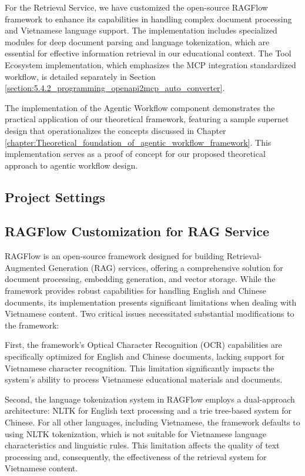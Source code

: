 \documentclass[../Main.tex]{subfiles}
\begin{document}
For the Retrieval Service, we have customized the open-source RAGFlow framework to enhance its capabilities in handling complex document processing and Vietnamese language support. The implementation includes specialized modules for deep document parsing and language tokenization, which are essential for effective information retrieval in our educational context. The Tool Ecosystem implementation, which emphasizes the MCP integration standardized workflow, is detailed separately in Section \ref{section:5.4.2_programming_openapi2mcp_auto_converter}.

The implementation of the Agentic Workflow component demonstrates the practical application of our theoretical framework, featuring a sample supernet design that operationalizes the concepts discussed in Chapter \ref{chapter:Theoretical_foundation_of_agentic_workflow_framework}. This implementation serves as a proof of concept for our proposed theoretical approach to agentic workflow design.

\subsection{Project Settings}
\label{section:5.1.1_project_settings}

\subsection{RAGFlow Customization for RAG Service}
\label{section:5.1.2_ragflow_customization}

RAGFlow is an open-source framework designed for building Retrieval-Augmented Generation (RAG) services, offering a comprehensive solution for document processing, embedding generation, and vector storage. While the framework provides robust capabilities for handling English and Chinese documents, its implementation presents significant limitations when dealing with Vietnamese content. Two critical issues necessitated substantial modifications to the framework:

First, the framework's Optical Character Recognition (OCR) capabilities are specifically optimized for English and Chinese documents, lacking support for Vietnamese character recognition. This limitation significantly impacts the system's ability to process Vietnamese educational materials and documents.

Second, the language tokenization system in RAGFlow employs a dual-approach architecture: NLTK for English text processing and a trie tree-based system for Chinese. For all other languages, including Vietnamese, the framework defaults to using NLTK tokenization, which is not suitable for Vietnamese language characteristics and linguistic rules. This limitation affects the quality of text processing and, consequently, the effectiveness of the retrieval system for Vietnamese content.
\end{document}
